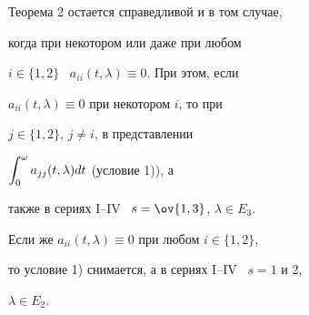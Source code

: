\begin{notenonum}


Теорема 2 остается справедливой и в том случае,


когда при некотором или даже при любом


$i\in\{1,2\}$ \ ${a_{ii} (t,\lambda) \equiv 0}$. При этом, если


${a_{ii} (t,\lambda) \equiv 0}$ при некотором $i$, то при


$j \in \{1,2\}$, $j \ne i$, в представлении


$\displaystyle\int_0^\omega a_{jj} (t,\lambda)dt$ (условие 1)), а


также в сериях I--IV \ $s=\ov{1,3}$, $\lambda \in E_3$.


Если же ${a_{ii} (t,\lambda) \equiv 0}$ при любом $i \in \{1,2\}$,


то условие 1) снимается, а в сериях I--IV \ $s=1$ и 2,


$\lambda \in E_2$.


\end{notenonum}





